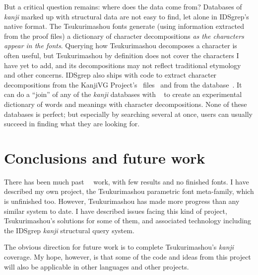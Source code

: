 \documentclass{ltugboat}
\begin{document}
But a critical question remains:  where does the data come from?  Databases
of \emph{kanji} marked up with structural data are not easy to find, let
alone in IDSgrep's native format.  The Tsukurimashou fonts generate (using
information extracted from the proof files) a dictionary of character
decompositions \emph{as the characters appear in the fonts}.  Querying how
Tsukurimashou decomposes a character is often useful, but Tsukurimashou by
definition does not cover the characters I have yet to add, and its
decompositions may not reflect traditional etymology and other concerns. 
IDSgrep also ships with code to extract  character decompositions
from the KanjiVG Project's \XML\ files~\cite{KanjiVG} and from the 
 database~\cite{CHISE}.  It can do a ``join'' of any of the
\emph{kanji} databases with ~\cite{EDICT2} to create an
experimental dictionary of words and meanings with character decompositions. 
None of these databases is perfect; but especially by searching several at
once, users can usually succeed in finding what they are looking for.


\section{Conclusions and future work}

There has been much past \CJK\ \MF\ work, with few results and no finished
fonts.  I have described my own project, the Tsukurimashou parametric font
meta-family, which is unfinished too.  However, Tsukurimashou has made more
progress than any similar system to date.  I have described issues facing
this kind of project, Tsukurimashou's solutions for some of them, and
associated technology including the IDSgrep \emph{kanji} structural query
system.

The obvious direction for future work is to complete Tsukurimashou's
\emph{kanji} coverage.  My hope, however, is that some of the code and ideas
from this project will also be applicable in other languages and other
projects.





\makesignature
\end{document}
